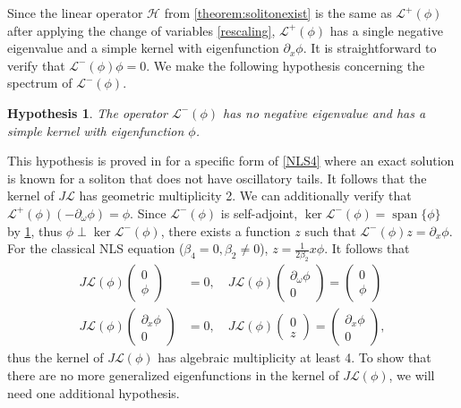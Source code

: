 \documentclass[12pt]{elsarticle}
\def\calH{{\mathcal H}}
\def\calL{{\mathcal L}}
\DeclareMathOperator{\spn}{span}
\newtheorem{hypothesis}{Hypothesis}
\begin{document}
Since the linear operator $\calH$ from \cref{theorem:solitonexist} is the same as $\calL^+(\phi)$ after applying the change of variables \cref{rescaling}, $\calL^+(\phi)$ has a single negative eigenvalue and a simple kernel with eigenfunction $\partial_x \phi$. It is straightforward to verify that $\calL^-(\phi) \phi = 0$. We make the following hypothesis concerning the spectrum of $\calL^-(\phi)$.

\begin{hypothesis}\label{hyp:Lminusspec}
The operator $\calL^-(\phi)$ has no negative eigenvalue and has a simple kernel with eigenfunction $\phi$.
\end{hypothesis}

This hypothesis is proved in \cite{Natali2015} for a specific form of \cref{NLS4} where an exact solution is known for a soliton that does not have oscillatory tails. It follows that the kernel of $J \calL$ has geometric multiplicity 2. We can additionally verify that $\calL^+(\phi)(-\partial_\omega \phi) = \phi$. Since $\calL^-(\phi)$ is self-adjoint, $\ker \calL^-(\phi) = \spn\{\phi\}$ by \cref{hyp:Lminusspec}, thus $\phi \perp \ker \calL^-(\phi)$, there exists a function $z$ such that $\calL^-(\phi) z = \partial_x \phi$. For the classical NLS equation ($\beta_4 = 0, \beta_2 \neq 0$), $z = \frac{1}{2 \beta_2} x \phi$. It follows that
\begin{equation}\label{Lphikernel}
\begin{aligned}
J \calL(\phi)\begin{pmatrix}0 \\ \phi \end{pmatrix} &= 0, \quad
J \calL(\phi)\begin{pmatrix} \partial_\omega \phi \\ 0 \end{pmatrix} = \begin{pmatrix}0 \\ \phi \end{pmatrix} \\
J \calL(\phi)\begin{pmatrix}\partial_x\phi \\ 0 \end{pmatrix} &= 0, \quad
J \calL(\phi)\begin{pmatrix} 0 \\ z \end{pmatrix} = \begin{pmatrix}\partial_x\phi \\ 0 \end{pmatrix},
\end{aligned}
\end{equation}
thus the kernel of $J \calL(\phi)$ has algebraic multiplicity at least 4. To show that there are no more generalized eigenfunctions in the kernel of $J \calL(\phi)$, we will need one additional hypothesis. 
\end{document}
